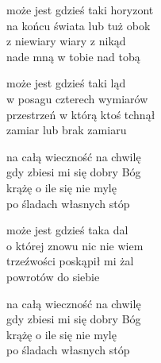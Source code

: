 \begin{text}
    może jest gdzieś taki horyzont\\
    na końcu świata lub tuż obok\\
    z niewiary wiary z nikąd\\
    nade mną w tobie nad tobą

    może jest gdzieś taki ląd\\
    w posagu czterech wymiarów\\
    przestrzeń w którą ktoś tchnął\\
    zamiar lub brak zamiaru

    na całą wieczność na chwilę\\
    gdy zbiesi mi się dobry Bóg\\
    krążę o ile się nie mylę\\
    po śladach własnych stóp

    może jest gdzieś taka dal\\
    o której znowu nic nie wiem\\
    trzeźwości poskąpił mi żal\\
    powrotów do siebie

    na całą wieczność na chwilę\\
    gdy zbiesi mi się dobry Bóg\\
    krążę o ile się nie mylę\\
    po śladach własnych stóp
\end{text}
\begin{chord}

\end{chord}